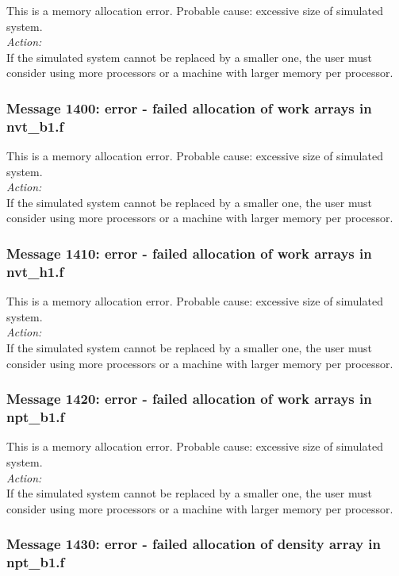 This is a memory allocation error. Probable cause: excessive size of
simulated system. \\

\noindent
{\em Action:}\\
If the simulated system cannot be replaced by a smaller one, the user
must consider using more processors or a machine with larger memory
per processor.

\subsubsection*{Message 1400: error - failed allocation of work arrays
in nvt\_b1.f}

This is a memory allocation error. Probable cause: excessive size of
simulated system. \\

\noindent
{\em Action:}\\
If the simulated system cannot be replaced by a smaller one, the user
must consider using more processors or a machine with larger memory
per processor.

\subsubsection*{Message 1410: error - failed allocation of work arrays
in nvt\_h1.f}

This is a memory allocation error. Probable cause: excessive size of
simulated system. \\

\noindent
{\em Action:}\\
If the simulated system cannot be replaced by a smaller one, the user
must consider using more processors or a machine with larger memory
per processor.

\subsubsection*{Message 1420: error - failed allocation of work arrays
in npt\_b1.f}

This is a memory allocation error. Probable cause: excessive size of
simulated system. \\

\noindent
{\em Action:}\\
If the simulated system cannot be replaced by a smaller one, the user
must consider using more processors or a machine with larger memory
per processor.

\subsubsection*{Message 1430: error - failed allocation of density
array in npt\_b1.f}

